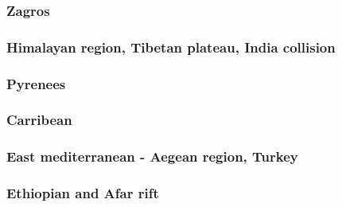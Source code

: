 \cite{koon90}
\cite{brbe95}
\cite{bekh96}
\cite{babr99}
\cite{libi06}
\cite{gedh02}\cite{pybf02}
\cite{gehd03}\cite{konc03}\cite{upke03}
\cite{pyeg10}
\cite{grel12}

\subsubsection*{Zagros}

\cite{vech06}
\cite{hamo10}
\cite{yakm11}
\cite{nipc13}
\cite{frba14}
\cite{ghbu14}
\cite{rugb17}

\subsubsection*{Himalayan region, Tibetan plateau, India collision} 

\cite{bird78}
\cite{moln89}
\cite{moem93}
\cite{wibe94}
\cite{chmm95}
\cite{robk97}
\cite{cblk00}\cite{clro00}
\cite{bejn01}\cite{laav01}\cite{zemk01}\cite{tzrm01}
\cite{kozc02}
\cite{reta03}
\cite{bejn04}
\cite{clbr05}
\cite{clrw06}
\cite{busc08}
\cite{hamo10}
\cite{care13}\cite{mutg13}\cite{chgz13}\cite{chgz13b}
\cite{whbb14}
\cite{bube17}
\cite{pirf18}
\cite{sccs19}

\subsubsection*{Pyrenees} 

\cite{giju98}
\cite{bemh00}
\cite{mcmg04}
\cite{jaml10}
\cite{fihv13b}
\cite{dual19}

\subsubsection*{Carribean} 

\subsubsection*{East mediterranean - Aegean region, Turkey} 

\cite{cazf10}

\subsubsection*{Ethiopian and Afar rift} 

\cite{mitk07}
\cite{cort08}
\cite{kekj09}
\cite{beve10}
\cite{phcs14}
\cite{brcr17}
\cite{brcg17}
\cite{cocf19}


